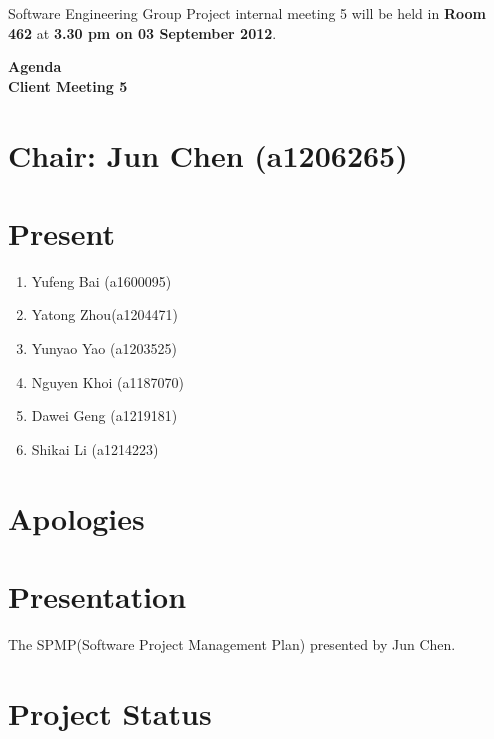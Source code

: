 \documentclass[11pt, a4paper]{article}
\begin{document}
\noindent Software Engineering Group Project internal meeting 5 will be held in {\bf Room 462} at {\bf 3.30 pm on 03 September 2012}.


\vspace*{15pt}

\begin{center}
\huge \bf Agenda \\Client Meeting 5
\end{center}



\section*{Chair: Jun Chen (a1206265)}
\section*{Present}
\begin{enumerate}
\item Yufeng Bai (a1600095)
\item Yatong Zhou(a1204471)
\item Yunyao Yao (a1203525)
\item Nguyen Khoi (a1187070)
\item Dawei Geng (a1219181)
\item Shikai Li (a1214223)
\end{enumerate}
\section{Apologies}

\section{Presentation}
The SPMP(Software Project Management Plan) presented by Jun Chen.

\section{Project Status}
\end{document}
